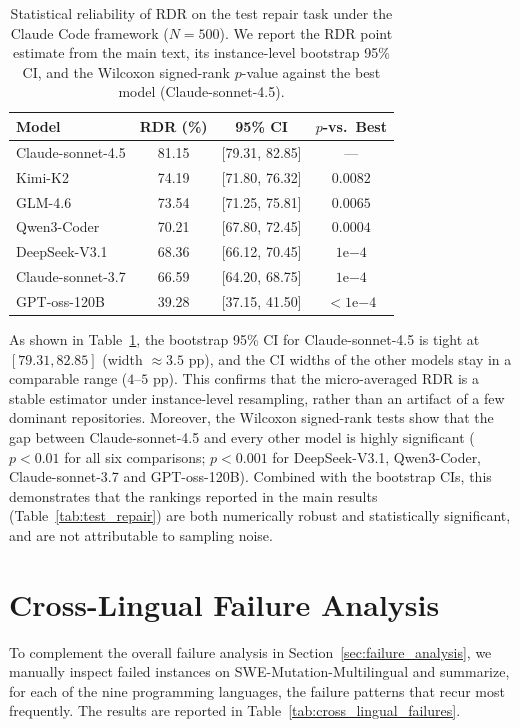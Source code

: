 \documentclass[11pt]{article}
\begin{document}
\begin{table}[h]
  \centering
  \small
  \renewcommand{\arraystretch}{1.2}
  \setlength{\tabcolsep}{5pt}
  \caption{
    Statistical reliability of RDR on the test repair task under the Claude Code framework ($N{=}500$). We report the RDR point estimate from the main text, its instance-level bootstrap 95\% CI, and the Wilcoxon signed-rank $p$-value against the best model (Claude-sonnet-4.5).
  }
  \begin{tabular}{l c c c}
    \toprule
    Model & RDR (\%) & 95\% CI & $p$-vs.\ Best \\
    \midrule
    Claude-sonnet-4.5 & 81.15 & [79.31, 82.85] & --- \\
    Kimi-K2           & 74.19 & [71.80, 76.32] & $0.0082$ \\
    GLM-4.6           & 73.54 & [71.25, 75.81] & $0.0065$ \\
    Qwen3-Coder       & 70.21 & [67.80, 72.45] & $0.0004$ \\
    DeepSeek-V3.1     & 68.36 & [66.12, 70.45] & $1\mathrm{e}{-4}$ \\
    Claude-sonnet-3.7 & 66.59 & [64.20, 68.75] & $1\mathrm{e}{-4}$ \\
    GPT-oss-120B      & 39.28 & [37.15, 41.50] & $<1\mathrm{e}{-4}$ \\
    \bottomrule
  \end{tabular}
  \label{tab:rdr_stats}
\end{table}

As shown in Table~\ref{tab:rdr_stats}, the bootstrap 95\% CI for Claude-sonnet-4.5 is tight at $[79.31, 82.85]$ (width $\approx 3.5$ pp), and the CI widths of the other models stay in a comparable range ($4$--$5$ pp). This confirms that the micro-averaged RDR is a stable estimator under instance-level resampling, rather than an artifact of a few dominant repositories. Moreover, the Wilcoxon signed-rank tests show that the gap between Claude-sonnet-4.5 and every other model is highly significant ($p<0.01$ for all six comparisons; $p<0.001$ for DeepSeek-V3.1, Qwen3-Coder, Claude-sonnet-3.7 and GPT-oss-120B). Combined with the bootstrap CIs, this demonstrates that the rankings reported in the main results (Table~\ref{tab:test_repair}) are both numerically robust and statistically significant, and are not attributable to sampling noise.

\section{Cross-Lingual Failure Analysis}
\label{sec:cross_lingual_failures}
To complement the overall failure analysis in Section~\ref{sec:failure_analysis}, we manually inspect failed instances on SWE-Mutation-Multilingual and summarize, for each of the nine programming languages, the failure patterns that recur most frequently. The results are reported in Table~\ref{tab:cross_lingual_failures}.
\end{document}
